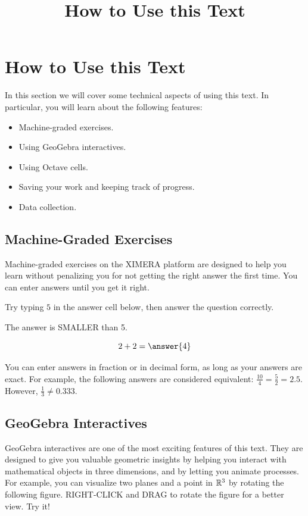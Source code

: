 \documentclass{ximera}
\title{How to Use this Text} \license{CC BY-NC-SA 4.0}
\begin{document}
\begin{abstract}
\end{abstract}
\maketitle



\section*{How to Use this Text}
In this section we will cover some technical aspects of using this text.  In particular, you will learn about the following features:
\begin{itemize}
    \item Machine-graded exercises.
    \item Using GeoGebra interactives.
    \item Using Octave cells.
    \item Saving your work and keeping track of progress.
    \item Data collection.
\end{itemize}

\subsection*{Machine-Graded Exercises}
Machine-graded exercises on the XIMERA platform are designed to help you learn without penalizing you for not getting the right answer the first time.  You can enter answers until you get it right.  
\begin{question}
Try typing $5$ in the answer cell below, then answer the question correctly.
\begin{hint} %
    The answer is SMALLER than 5.
\end{hint}
$$2+2=\answer{4}$$
\end{question}
You can enter answers in fraction or in decimal form, as long as your answers are exact.  For example, the following answers are considered equivalent: $\frac{10}{4}=\frac{5}{2}=2.5$.  However, $\frac{1}{3}\neq 0.333$.

\subsection*{GeoGebra Interactives}
GeoGebra interactives are one of the most exciting features of this text.  They are designed to give you valuable geometric insights by helping you interact with mathematical objects in three dimensions, and by letting you animate processes.  For example, you can visualize two planes and a point in $\mathbb{R}^3$ by rotating the following figure.  RIGHT-CLICK and DRAG to rotate the figure for a better view.  Try it!
\end{document}
